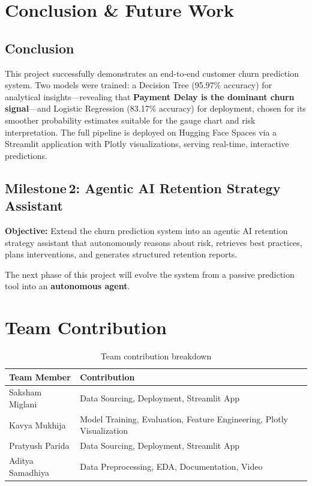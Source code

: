 \documentclass[12pt, a4paper]{article}
\begin{document}
\section{Conclusion \& Future Work}

\subsection{Conclusion}

This project successfully demonstrates an end-to-end customer churn prediction system. Two models were trained: a Decision Tree (95.97\% accuracy) for analytical insights---revealing that \textbf{Payment Delay is the dominant churn signal}---and Logistic Regression (83.17\% accuracy) for deployment, chosen for its smoother probability estimates suitable for the gauge chart and risk interpretation. The full pipeline is deployed on Hugging Face Spaces via a Streamlit application with Plotly visualizations, serving real-time, interactive predictions.

\subsection{Milestone\,2: Agentic AI Retention Strategy Assistant}

\textbf{Objective:} Extend the churn prediction system into an agentic AI retention strategy assistant that autonomously reasons about risk, retrieves best practices, plans interventions, and generates structured retention reports.

The next phase of this project will evolve the system from a passive prediction tool into an \textbf{autonomous agent}.

\section*{Team Contribution}

\begin{table}[H]
\centering
\caption{Team contribution breakdown}
\label{tab:team}
\renewcommand{\arraystretch}{1.3}
\begin{tabular}{@{} l p{8cm} @{}}
\toprule
\textbf{Team Member} & \textbf{Contribution} \\
\midrule
Saksham Miglani & Data Sourcing, Deployment, Streamlit App \\
Kavya Mukhija & Model Training, Evaluation, Feature Engineering, Plotly Visualization \\
Pratyush Parida & Data Sourcing, Deployment, Streamlit App \\
Aditya Samadhiya & Data Preprocessing, EDA, Documentation, Video \\
\bottomrule
\end{tabular}
\end{table}
\end{document}
